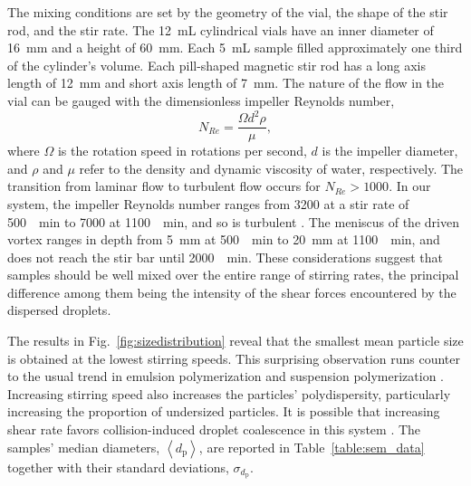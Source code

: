 \documentclass[journal=langd5,manuscript=article]{achemso}
\newcommand{\avg}[1]{\left< #1 \right>}
\begin{document}
The mixing conditions are set by the geometry of the vial, the shape
of the stir rod, and the stir rate. The \SI{12}{\milli\liter}
cylindrical vials 
have an inner diameter of \SI{16}{\milli\meter} and a height of \SI{60}{\milli\meter}.
Each \SI{5}{\milli\liter} sample filled approximately one third of the cylinder's volume.
Each pill-shaped magnetic stir rod has a long axis length of \SI{12}{\milli\meter} 
and short axis length of \SI{7}{\milli\meter}.
The nature of the flow in the vial can be gauged with
the dimensionless impeller Reynolds number,
\begin{equation}
    N_{Re} = \frac{\Omega d^2 \rho}{\mu},
\end{equation}
where $\Omega$ is the rotation speed in rotations per second, 
$d$ is the impeller diameter, and $\rho$ and $\mu$ refer to the
density and dynamic viscosity of water, respectively.
The transition from laminar flow to turbulent flow occurs for
$N_{Re} > \num{1000}$.
In our system, the impeller Reynolds number ranges from
\num{3200} at a stir rate of \SI{500}{\per\minute}
to \num{7000} at \SI{1100}{\per\minute},
and so is turbulent \cite{halasz2007vortex}.
The meniscus of the driven vortex ranges in depth
from \SI{5}{\mm} at \SI{500}{\per\minute}
to \SI{20}{\mm} at \SI{1100}{\per\minute}, and does not reach
the stir bar until \SI{2000}{\per\minute}.
These considerations suggest that samples should be
well mixed over the entire range of stirring rates,
the principal difference among them being the intensity of the shear forces
encountered by the dispersed droplets.

The results in Fig.~\ref{fig:sizedistribution}
reveal that the smallest mean particle size is
obtained at the lowest stirring speeds.
This surprising observation
runs counter to the usual trend \cite{oles1992shear,eggersdorfer2010fragmentation}
in emulsion polymerization
\cite{chern06}
and suspension polymerization
\cite{arshady92}.
Increasing stirring speed also increases the particles'
polydispersity, particularly increasing the proportion of undersized particles.
It is possible that increasing shear rate favors 
collision-induced droplet coalescence in this system
\cite{yeung2003shear}.
The samples' median diameters, $\avg{d_{\text{p}}}$,
are reported in Table~\ref{table:sem_data} together
with their standard deviations, $\sigma_{d_{\text{p}}}$.
\end{document}
